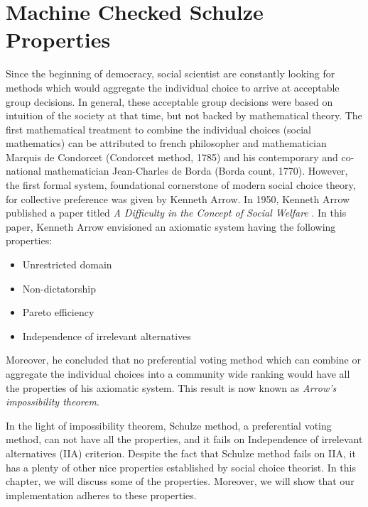 \chapter{Machine Checked Schulze Properties}
\label{cha:machine_checked}


 Since the beginning of democracy, social scientist are constantly looking for methods  which would 
 aggregate the individual choice  to arrive at acceptable group decisions. 
 In general, these acceptable group decisions were based on intuition of the society at that time,
 but not backed by mathematical theory. The first mathematical 
 treatment to combine the individual choices (social mathematics)  can be 
 attributed to french philosopher and mathematician Marquis de Condorcet (Condorcet method, 1785) and his contemporary
 and co-national mathematician Jean-Charles de Borda (Borda count, 1770). However, the first formal system, foundational cornerstone
 of modern social choice theory, for collective preference was given by Kenneth Arrow. In 1950, Kenneth Arrow 
 published a paper titled \textit{A Difficulty in the Concept of Social Welfare} \citep{arrow1950difficulty}. 
 In this paper, Kenneth Arrow envisioned an axiomatic system having the following properties:
 
 \begin{itemize}
 \item Unrestricted domain
 \item Non-dictatorship
 \item Pareto efficiency
 \item Independence of irrelevant alternatives
 \end{itemize}
 
 Moreover, he concluded that no preferential voting method which can combine or aggregate the individual choices into a community wide 
 ranking would have all the properties of his axiomatic system. This result is now known as \textit{Arrow's impossibility theorem}. 


 In the light of impossibility theorem, Schulze method, a preferential voting method, can not have all the properties, and it fails on 
 Independence of irrelevant alternatives (IIA) criterion. Despite the fact that Schulze method fails on IIA,  it has a plenty of other nice 
 properties established by social choice theorist. In this chapter, we will discuss some of 
 the properties.  Moreover, we will show that our implementation adheres to these properties. 
 
